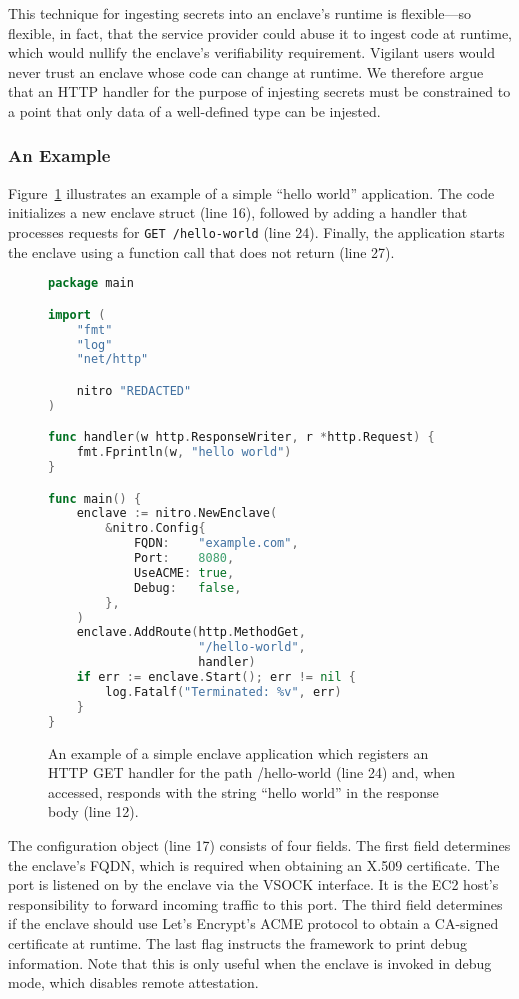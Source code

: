 This technique for ingesting secrets into an enclave's runtime is flexible---so
flexible, in fact, that the service provider could abuse it to ingest code at
runtime, which would nullify the enclave's verifiability requirement.  Vigilant
users would never trust an enclave whose code can change at runtime.  We
therefore argue that an HTTP handler for the purpose of injesting secrets must
be constrained to a point that only data of a well-defined type can be injested.

\subsubsection{An Example}
\label{sec:example}

Figure~\ref{fig:hello-world} illustrates an example of a simple ``hello world''
application.  The code initializes a new enclave struct (line 16), followed by
adding a handler that processes requests for \texttt{GET /hello-world} (line
24).  Finally, the application starts the enclave using a function call that
does not return (line 27).

\begin{figure}[t]
\begin{lstlisting}[language=go]
package main

import (
    "fmt"
    "log"
    "net/http"

    nitro "REDACTED"
)

func handler(w http.ResponseWriter, r *http.Request) {
    fmt.Fprintln(w, "hello world")
}

func main() {
    enclave := nitro.NewEnclave(
        &nitro.Config{
            FQDN:    "example.com",
            Port:    8080,
            UseACME: true,
            Debug:   false,
        },
    )
    enclave.AddRoute(http.MethodGet,
                     "/hello-world",
                     handler)
    if err := enclave.Start(); err != nil {
        log.Fatalf("Terminated: %v", err)
    }
}
\end{lstlisting}
\caption{An example of a simple enclave application which registers an HTTP GET
  handler for the path /hello-world (line 24) and, when accessed, responds with
  the string ``hello world'' in the response body (line 12).}
\label{fig:hello-world}
\end{figure}

The configuration object (line 17) consists of four fields.  The first field
determines the enclave's FQDN, which is required when obtaining an X.509
certificate.  The port is listened on by the enclave via the VSOCK interface.
It is the EC2 host's responsibility to forward incoming traffic to
this port.  The third field determines if the enclave should use Let's Encrypt's
ACME protocol to obtain a CA-signed certificate at runtime.
The last flag instructs the framework to print debug information.  Note that
this is only useful when the enclave is invoked in debug mode, which disables
remote attestation.
